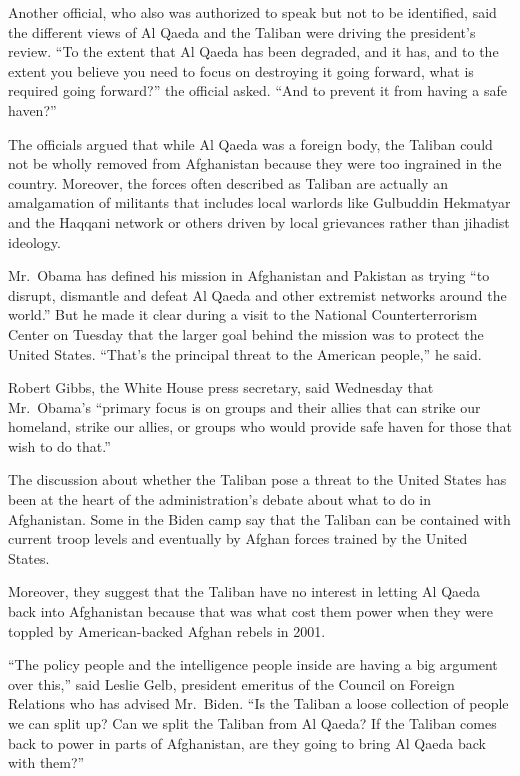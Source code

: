 ﻿\documentclass[12pt]{article}
\begin{document}
Another official, who also was authorized to speak but not to be identified, said the different
views of Al Qaeda and the Taliban were driving the president's review. ``To the extent that Al Qaeda
has been degraded, and it has, and to the extent you believe you need to focus on destroying it
going forward, what is required going forward?'' the official asked. ``And to prevent it from having
a safe haven?''

The officials argued that while Al Qaeda was a foreign body, the Taliban could not be wholly removed
from Afghanistan because they were too ingrained in the country. Moreover, the forces often
described as Taliban are actually an amalgamation of militants that includes local warlords like
Gulbuddin Hekmatyar and the Haqqani network or others driven by local grievances rather than
jihadist ideology.

Mr.~Obama has defined his mission in Afghanistan and Pakistan as trying ``to disrupt, dismantle and
defeat Al Qaeda and other extremist networks around the world.'' But he made it clear during a visit
to the National Counterterrorism Center on Tuesday that the larger goal behind the mission was to
protect the United States. ``That's the principal threat to the American people,'' he said.

Robert Gibbs, the White House press secretary, said Wednesday that Mr.~Obama's ``primary focus is on
groups and their allies that can strike our homeland, strike our allies, or groups who would provide
safe haven for those that wish to do that.''

The discussion about whether the Taliban pose a threat to the United States has been at the heart of
the administration's debate about what to do in Afghanistan. Some in the Biden camp say that the
Taliban can be contained with current troop levels and eventually by Afghan forces trained by the
United States.

Moreover, they suggest that the Taliban have no interest in letting Al Qaeda back into Afghanistan
because that was what cost them power when they were toppled by American-backed Afghan rebels in
2001.

``The policy people and the intelligence people inside are having a big argument over this,'' said
Leslie Gelb, president emeritus of the Council on Foreign Relations who has advised Mr.~Biden. ``Is
the Taliban a loose collection of people we can split up? Can we split the Taliban from Al Qaeda? If
the Taliban comes back to power in parts of Afghanistan, are they going to bring Al Qaeda back with
them?''
\end{document}
